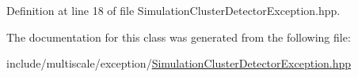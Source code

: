 Definition at line 18 of file Simulation\-Cluster\-Detector\-Exception.\-hpp.



The documentation for this class was generated from the following file\-:\begin{DoxyCompactItemize}
\item 
include/multiscale/exception/\hyperlink{SimulationClusterDetectorException_8hpp}{Simulation\-Cluster\-Detector\-Exception.\-hpp}\end{DoxyCompactItemize}
